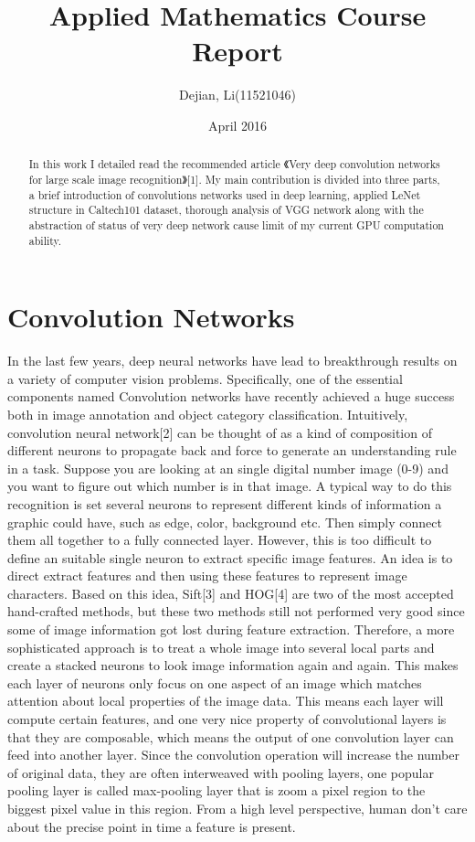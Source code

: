 \documentclass{article}
\title{Applied Mathematics Course Report}
\author{Dejian, Li(11521046)}
\date{April 2016}
\begin{document}
\maketitle
\begin{abstract}
	In this work I detailed read the recommended article 《Very deep convolution networks for large scale image recognition》[1]. My main contribution is divided into three parts, a brief introduction of convolutions networks used in deep learning, applied LeNet structure in Caltech101 dataset, thorough analysis of VGG network along with the abstraction of status of very deep network cause limit of my current GPU computation ability.   
\end{abstract}
\section{Convolution Networks}
In the last few years, deep neural networks have lead to breakthrough results on a variety of computer vision problems. Specifically, one of the essential components named Convolution networks have recently achieved a huge success both in image annotation and object category classification. Intuitively, convolution neural network[2] can be thought of as a kind of composition of different neurons to propagate back and force to generate an understanding rule in a task. Suppose you are looking at an single digital number image (0-9) and you want to figure out which number is in that image. A typical way to do this recognition is set several neurons to represent different kinds of information a graphic could have, such as edge, color, background etc. Then simply connect them all together to a fully connected layer. However, this is too difficult to define an suitable single neuron to extract specific image features. An idea is to direct extract features and then using these features to represent image characters. Based on this idea, Sift[3] and HOG[4] are two of the most accepted hand-crafted methods, but these two methods still not performed very good since some of image information got lost during feature extraction. Therefore, a more sophisticated approach is to treat a whole image into  several local parts and create a stacked neurons to look image information again and again. This makes each layer of neurons only focus on one aspect of an image which matches attention about local properties of the image data. This means each layer will compute certain features, and one very nice property of convolutional layers is that they are composable, which means the output of one convolution layer can feed into another layer. Since the convolution operation will increase the number of original data, they are often interweaved with pooling layers, one popular pooling layer is called max-pooling layer that is zoom a pixel region to the biggest pixel value in this region. From a high level perspective, human don't care about the precise point in time a feature is present. 
\end{document}
